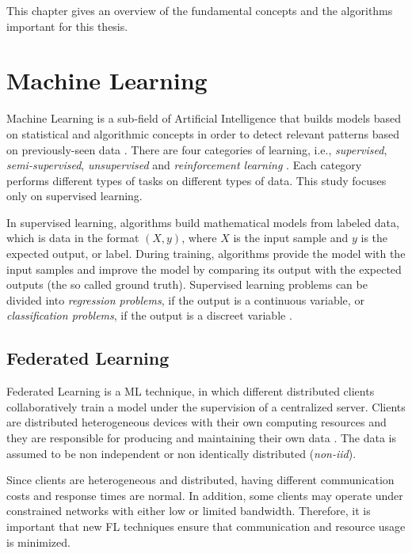 This chapter gives an overview of the fundamental concepts and the algorithms important for this thesis.

\section{Machine Learning}\label{background:machine_learning}

Machine Learning is a sub-field of Artificial Intelligence that builds models based on statistical and algorithmic concepts in order to detect relevant patterns based on previously-seen data \cite{geron_2019}. There are four categories of learning, i.e., \textit{supervised}, \textit{semi-supervised}, \textit{unsupervised} and \textit{reinforcement learning} \cite{Sarker2021}. Each category performs different types of tasks on different types of data. This study focuses only on supervised learning.

In supervised learning, algorithms build mathematical models from labeled data, which is data in the format $(X, y)$, where $X$ is the input sample and $y$ is the expected output, or label. During training, algorithms provide the model with the input samples and improve the model by comparing its output with the expected outputs (the so called ground truth). Supervised learning problems can be divided into \textit{regression problems}, if the output is a continuous variable, or \textit{classification problems}, if the output is a discreet variable \cite{Sarker2021}.

\subsection{Federated Learning}\label{background:federated_learning}

Federated Learning is a ML technique, in which different distributed clients collaboratively train a model under the supervision of a centralized server. Clients are distributed heterogeneous devices with their own computing resources and they are responsible for producing and maintaining their own data \cite{9084352}. The data is assumed to be non independent or non identically distributed (\textit{non-iid}).

Since clients are heterogeneous and distributed, having different communication costs and response times are normal. In addition, some clients may operate under constrained networks with either low or limited bandwidth. Therefore, it is important that new FL techniques ensure that communication and resource usage is minimized.


